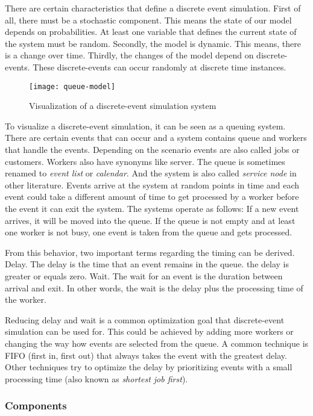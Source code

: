 There are certain characteristics that define a discrete event simulation.
First of all, there must be a stochastic component. This means the state of our model depends on probabilities. At least one variable that defines the current state of the system must be random.
Secondly, the model is dynamic. This means, there is a change over time.
Thirdly, the changes of the model depend on discrete-events. These discrete-events can occur randomly at discrete time instances.


\begin{figure}[h!]
 \caption{Visualization of a discrete-event simulation system}
 \texttt{[image: queue-model]}
\end{figure}

To visualize a discrete-event simulation, it can be seen as a queuing system. There are certain events that can occur and a system contains queue and workers that handle the events.
Depending on the scenario events are also called jobs or customers. Workers also have synonyms like server. The queue is sometimes renamed to \textit{event list} or \textit{calendar}. And the system is also called \textit{service node} in other literature.
Events arrive at the system at random points in time and each event could take a different amount of time to get processed by a worker before the event it can exit the system. The systems operate as follows: If a new event arrives, it will be moved into the queue. If the queue is not empty and at least one worker is not busy, one event is taken from the queue and gets processed.

From this behavior, two important terms regarding the timing can be derived.
Delay. The delay is the time that an event remains in the queue. the delay is greater or equals zero.
Wait. The wait for an event is the duration between arrival and exit. In other words, the wait is the delay plus the processing time of the worker.

Reducing delay and wait is a common optimization goal that discrete-event simulation can be used for. This could be achieved by adding more workers or changing the way how events are selected from the queue. A common technique is FIFO (first in, first out) that always takes the event with the greatest delay. Other techniques try to optimize the delay by prioritizing events with a small processing time (also known as \textit{shortest job first}).

\subsubsection{Components}
\label{des:components}

